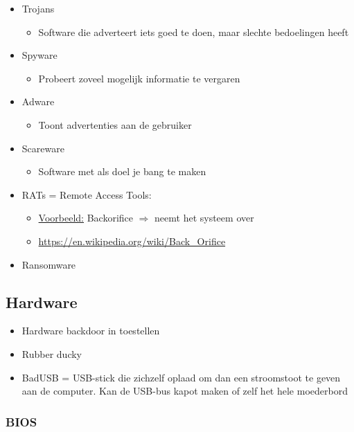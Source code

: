 \documentclass{article}
\begin{document}
\begin{itemize}
    \item Trojans
    \begin{itemize}
        \item Software die adverteert iets goed te doen, maar slechte bedoelingen heeft
    \end{itemize}
    \item Spyware
    \begin{itemize}
        \item Probeert zoveel mogelijk informatie te vergaren
    \end{itemize}
    \item Adware
    \begin{itemize}
        \item Toont advertenties aan de gebruiker
    \end{itemize}
    \item Scareware
    \begin{itemize}
        \item Software met als doel je bang te maken
    \end{itemize}
    \item RATs = Remote Access Tools:
    \begin{itemize}
        \item \underline{Voorbeeld:} Backorifice $\Rightarrow$ neemt het systeem over
        \item \url{https://en.wikipedia.org/wiki/Back\_Orifice}
    \end{itemize}
    \item Ransomware
\end{itemize}


\subsection{Hardware}
\begin{itemize}
    \item Hardware backdoor in toestellen
    \item Rubber ducky
    \item BadUSB = USB-stick die zichzelf oplaad om dan een stroomstoot te geven aan de computer. Kan de USB-bus kapot maken of zelf het hele moederbord
\end{itemize}


\subsubsection{BIOS}
\end{document}
